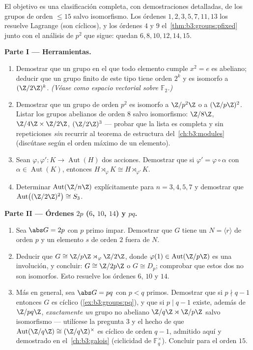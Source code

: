 \begin{problem}\label{pb:b3:groups:1} El objetivo es una clasificación
completa, con demostraciones detalladas, de los grupos de orden
$\leq 15$ salvo isomorfismo. Los órdenes $1, 2, 3, 5,
7, 11, 13$ los resuelve Lagrange (son cíclicos), y los órdenes $4$ y $9$
el~\cref{thm:b3:groups:pfixed} junto con el análisis de $p^2$ que sigue:
quedan $6, 8, 10, 12, 14, 15$.

\medskip
\noindent\textbf{Parte I --- Herramientas.}
\begin{enumerate}
  \item Demostrar que un grupo en el que todo elemento cumple $x^2 =
        e$ es abeliano; deducir que un grupo finito de este tipo tiene
  orden $2^k$ y es isomorfo a $(\Z/2\Z)^k$. \emph{(Véase como espacio
  vectorial sobre $\mathbb F_2$.)} \item Demostrar que un grupo de orden
  $p^2$ es isomorfo a $\Z/p^2\Z$ o a $(\Z/p\Z)^2$. Listar los grupos
  abelianos de orden $8$ salvo isomorfismo: $\Z/8\Z$, $\Z/4\Z \times
        \Z/2\Z$, $(\Z/2\Z)^3$ --- probar que la lista es completa y sin
  repeticiones \emph{sin} recurrir al teorema de estructura
  del~\cref{ch:b3:modules} (discútase según el orden máximo de un
  elemento). \item Sean
  $\varphi, \varphi' \colon K \to \operatorname{Aut}(H)$ dos
  acciones. Demostrar que si
  $\varphi' = \varphi \circ
        \alpha$ con $\alpha \in \operatorname{Aut}(K)$, entonces $H
        \rtimes_{\varphi} K \cong H \rtimes_{\varphi'} K$. \item
  Determinar $\operatorname{Aut}(\Z/n\Z)$ explícitamente para
  $n = 3, 4, 5,
        7$ y demostrar que $\operatorname{Aut}\bigl((\Z/2\Z)^2
        \bigr) \cong S_3$.
\end{enumerate}

\medskip
\noindent\textbf{Parte II --- Órdenes $2p$ ($6$, $10$, $14$) y
$pq$.}
\begin{enumerate}[resume]
  \item Sea $\abs G = 2p$ con $p$ primo impar. Demostrar que $G$ tiene
  un 
  $N = \langle r \rangle$ de orden $p$ y un elemento $s$ de orden $2$
  fuera de $N$. \item Deducir que
  $G \cong \Z/p\Z \rtimes_\varphi \Z/2\Z$, donde
  $\varphi(1) \in \operatorname{Aut}(\Z/p\Z)$ es una involución, y
  concluir: $G \cong \Z/2p\Z$ o $G \cong
        D_p$; comprobar que estos dos no son isomorfos. Esto resuelve
  los órdenes $6$, $10$ y $14$. \item Más en general, sea $\abs G = pq$
  con $p < q$ primos. Demostrar que si $p \nmid q-1$ entonces $G$ es
  cíclico (\cref{ex:b3:groups:pq}), y que si $p \mid q - 1$ existe,
  además de $\Z/pq\Z$, \emph{exactamente un} grupo no abeliano
  $\Z/q\Z \rtimes \Z/p\Z$ salvo isomorfismo --- utilícese la pregunta 3
  y el hecho de que $\operatorname{Aut}(\Z/q\Z) \cong
        (\Z/q\Z)^\times$ es cíclico de orden $q - 1$, admitido aquí y
  demostrado en el~\cref{ch:b3:galois} (ciclicidad de
  $\mathbb F_q^\times$). Concluir para el orden $15$.
\end{enumerate}


\end{problem}
